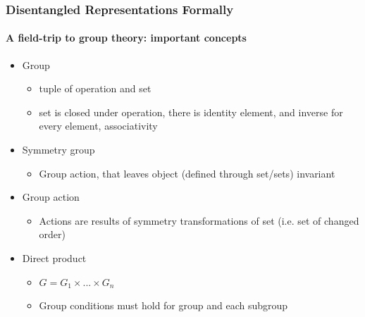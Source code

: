 \documentclass[9pt]{beamer}
\begin{document}
\begin{frame}
\frametitle{Disentangled Representations Formally}
\framesubtitle{A field-trip to group theory: important concepts}
\begin{itemize}%
	\item Group
	\begin{itemize}
		\item tuple of operation and set
		\item set is closed under operation, there is identity element, and inverse for every element, associativity
	\end{itemize}
	\item Symmetry group
	\begin{itemize}
		\item Group action, that leaves object (defined through set/sets) invariant
	\end{itemize}
	\item Group action
	\begin{itemize}
		\item Actions are results of symmetry transformations of set (i.e. set of changed order)
	\end{itemize}
	\item Direct product
	\begin{itemize}
		\item $G = G_1 \times ... \times G_n$
		\item Group conditions must hold for group and each subgroup
	\end{itemize}
\end{itemize}
\end{frame} 
\end{document}
